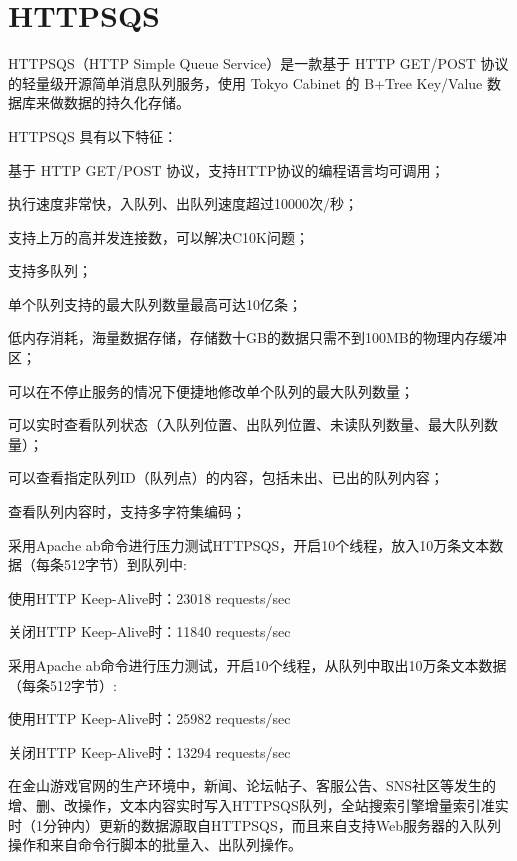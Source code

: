 \chapter{HTTPSQS}


HTTPSQS（HTTP Simple Queue Service）是一款基于 HTTP GET/POST 协议的轻量级开源简单消息队列服务，使用 Tokyo Cabinet 的 B+Tree Key/Value 数据库来做数据的持久化存储。

HTTPSQS 具有以下特征：

\begin{compactitem}
\item 基于 HTTP GET/POST 协议，支持HTTP协议的编程语言均可调用；
\item 执行速度非常快，入队列、出队列速度超过10000次/秒；
\item 支持上万的高并发连接数，可以解决C10K问题；
\item 支持多队列；
\item 单个队列支持的最大队列数量最高可达10亿条；
\item 低内存消耗，海量数据存储，存储数十GB的数据只需不到100MB的物理内存缓冲区；
\item 可以在不停止服务的情况下便捷地修改单个队列的最大队列数量；
\item 可以实时查看队列状态（入队列位置、出队列位置、未读队列数量、最大队列数量）；
\item 可以查看指定队列ID（队列点）的内容，包括未出、已出的队列内容；
\item 查看队列内容时，支持多字符集编码；
\end{compactitem}


采用Apache ab命令进行压力测试HTTPSQS，开启10个线程，放入10万条文本数据（每条512字节）到队列中:

\begin{compactitem}
\item 使用HTTP Keep-Alive时：23018 requests/sec
\item 关闭HTTP Keep-Alive时：11840 requests/sec
\end{compactitem}

采用Apache ab命令进行压力测试，开启10个线程，从队列中取出10万条文本数据（每条512字节）:

\begin{compactitem}
\item 使用HTTP Keep-Alive时：25982 requests/sec
\item 关闭HTTP Keep-Alive时：13294 requests/sec
\end{compactitem}

在金山游戏官网的生产环境中，新闻、论坛帖子、客服公告、SNS社区等发生的增、删、改操作，文本内容实时写入HTTPSQS队列，全站搜索引擎增量索引准实时（1分钟内）更新的数据源取自HTTPSQS，而且来自支持Web服务器的入队列操作和来自命令行脚本的批量入、出队列操作。


